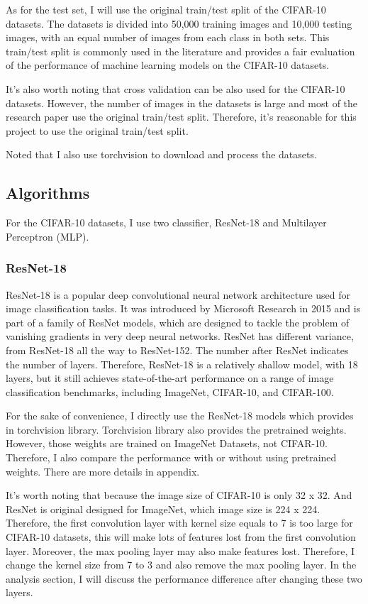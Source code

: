 \documentclass[twocolumn, draft]{extarticle}
\begin{document}
As for the test set, I will use the original train/test split of the CIFAR-10 datasets. The datasets is divided into 50,000 training images and 10,000 testing images, with an equal number of images from each class in both sets. This train/test split is commonly used in the literature and provides a fair evaluation of the performance of machine learning models on the CIFAR-10 datasets.

It's also worth noting that cross validation can be also used for the CIFAR-10 datasets. However, the number of images in the datasets is large and most of the research paper use the original train/test split. Therefore, it's reasonable for this project to use the original train/test split.

Noted that I also use torchvision to download and process the datasets.

\subsection{Algorithms}

For the CIFAR-10 datasets, I use two classifier, ResNet-18 and Multilayer Perceptron (MLP).

\subsubsection{ResNet-18}

ResNet-18 is a popular deep convolutional neural network architecture used for image classification tasks. It was introduced by Microsoft Research in 2015 and is part of a family of ResNet models, which are designed to tackle the problem of vanishing gradients in very deep neural networks. ResNet has different variance, from ResNet-18 all the way to ResNet-152. The number after ResNet indicates the number of layers. Therefore, ResNet-18 is a relatively shallow model, with 18 layers, but it still achieves state-of-the-art performance on a range of image classification benchmarks, including ImageNet, CIFAR-10, and CIFAR-100.

For the sake of convenience, I directly use the ResNet-18 models which provides in torchvision library. Torchvision library also provides the pretrained weights. However, those weights are trained on ImageNet Datasets, not CIFAR-10. Therefore, I also compare the performance with or without using pretrained weights. There are more details in appendix.

It's worth noting that because the image size of CIFAR-10 is only 32 x 32. And ResNet is original designed for ImageNet, which image size is 224 x 224. Therefore, the first convolution layer with kernel size equals to 7 is too large for CIFAR-10 datasets, this will make lots of features lost from the first convolution layer. Moreover, the max pooling layer may also make features lost. Therefore, I change the kernel size from 7 to 3 and  also remove the max pooling layer. In the analysis section, I will discuss the performance difference after changing these two layers.
\end{document}
